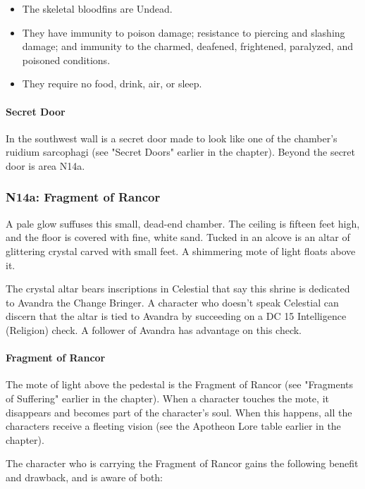 \documentclass[10pt,a4paper,twoside,bg=print,twocolumn,openany,nodeprecatedcode]{dndbook}
\begin{document}
\begin{itemize}
\item The skeletal bloodfins are Undead.
\item They have immunity to poison damage; resistance to piercing and slashing damage; and immunity to the charmed, deafened, frightened, paralyzed, and poisoned conditions.
\item They require no food, drink, air, or sleep.
\end{itemize}

\paragraph{Secret Door}
In the southwest wall is a secret door made to look like one of the chamber's ruidium sarcophagi (see "Secret Doors" earlier in the chapter). Beyond the secret door is area N14a.

\subsubsection{N14a: Fragment of Rancor}
\begin{DndReadAloud}{}
A pale glow suffuses this small, dead-end chamber. The ceiling is fifteen feet high, and the floor is covered with fine, white sand. Tucked in an alcove is an altar of glittering crystal carved with small feet. A shimmering mote of light floats above it.

\end{DndReadAloud}

The crystal altar bears inscriptions in Celestial that say this shrine is dedicated to Avandra the Change Bringer. A character who doesn't speak Celestial can discern that the altar is tied to Avandra by succeeding on a DC 15 Intelligence (Religion) check. A follower of Avandra has advantage on this check.

\paragraph{Fragment of Rancor}
The mote of light above the pedestal is the Fragment of Rancor (see "Fragments of Suffering" earlier in the chapter). When a character touches the mote, it disappears and becomes part of the character's soul. When this happens, all the characters receive a fleeting vision (see the Apotheon Lore table earlier in the chapter).

The character who is carrying the Fragment of Rancor gains the following benefit and drawback, and is aware of both:
\end{document}
